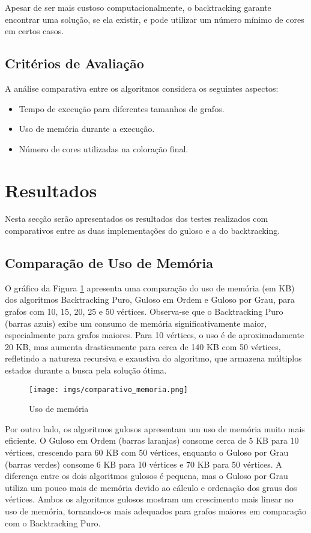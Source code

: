\documentclass[12pt]{article}
\begin{document}
Apesar de ser mais custoso computacionalmente, o backtracking garante encontrar uma solução, se ela existir, e pode utilizar um número mínimo de cores em certos casos.

\subsection{Critérios de Avaliação}

A análise comparativa entre os algoritmos considera os seguintes aspectos:

\begin{itemize}
    \item Tempo de execução para diferentes tamanhos de grafos.
    \item Uso de memória durante a execução.
    \item Número de cores utilizadas na coloração final.
\end{itemize}

\section{Resultados}
Nesta secção serão apresentados os resultados dos testes realizados com comparativos entre as duas implementações do guloso e a do backtracking.
\subsection{Comparação de Uso de Memória}

O gráfico da Figura \ref{fig:mem} apresenta uma comparação do uso de memória (em KB) dos algoritmos Backtracking Puro, Guloso em Ordem e Guloso por Grau, para grafos com 10, 15, 20, 25 e 50 vértices. Observa-se que o Backtracking Puro (barras azuis) exibe um consumo de memória significativamente maior, especialmente para grafos maiores. Para 10 vértices, o uso é de aproximadamente 20 KB, mas aumenta drasticamente para cerca de 140 KB com 50 vértices, refletindo a natureza recursiva e exaustiva do algoritmo, que armazena múltiplos estados durante a busca pela solução ótima.

\begin{figure}[!htb]
    \centering
    \texttt{[image: imgs/comparativo\_memoria.png]}
    \caption{Uso de memória}
    \label{fig:mem}
\end{figure}


Por outro lado, os algoritmos gulosos apresentam um uso de memória muito mais eficiente. O Guloso em Ordem (barras laranjas) consome cerca de 5 KB para 10 vértices, crescendo para 60 KB com 50 vértices, enquanto o Guloso por Grau (barras verdes) consome 6 KB para 10 vértices e 70 KB para 50 vértices. A diferença entre os dois algoritmos gulosos é pequena, mas o Guloso por Grau utiliza um pouco mais de memória devido ao cálculo e ordenação dos graus dos vértices. Ambos os algoritmos gulosos mostram um crescimento mais linear no uso de memória, tornando-os mais adequados para grafos maiores em comparação com o Backtracking Puro.
\end{document}
